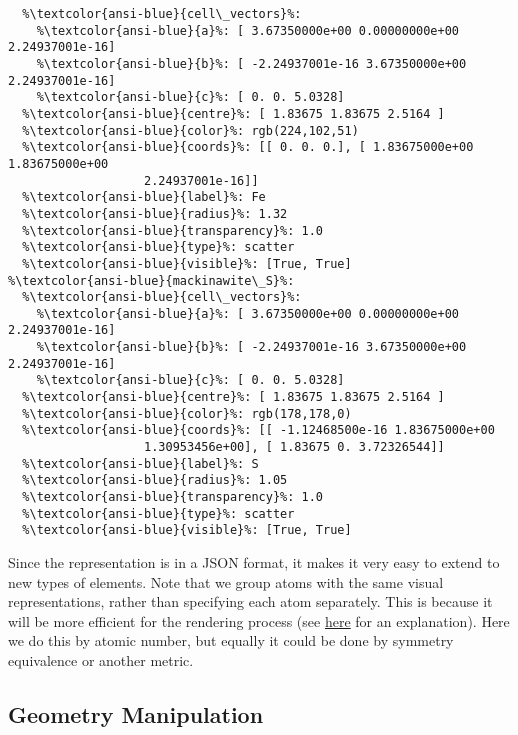\documentclass[10pt,parskip=half,
	toc=sectionentrywithdots,
	bibliography=totocnumbered,
	captions=tableheading,numbers=noendperiod]{scrartcl}
\begin{document}
\begin{lstlisting}[language={},postbreak={},numbers=none,xrightmargin=7pt,belowskip=5pt,aboveskip=5pt,breakindent=0pt,escapechar=\%]
%\textcolor{ansi-blue}{mackinawite\_Fe}%: 
  %\textcolor{ansi-blue}{cell\_vectors}%: 
    %\textcolor{ansi-blue}{a}%: [ 3.67350000e+00 0.00000000e+00 2.24937001e-16]
    %\textcolor{ansi-blue}{b}%: [ -2.24937001e-16 3.67350000e+00 2.24937001e-16]
    %\textcolor{ansi-blue}{c}%: [ 0. 0. 5.0328]
  %\textcolor{ansi-blue}{centre}%: [ 1.83675 1.83675 2.5164 ]
  %\textcolor{ansi-blue}{color}%: rgb(224,102,51)
  %\textcolor{ansi-blue}{coords}%: [[ 0. 0. 0.], [ 1.83675000e+00 1.83675000e+00 
                   2.24937001e-16]]
  %\textcolor{ansi-blue}{label}%: Fe
  %\textcolor{ansi-blue}{radius}%: 1.32
  %\textcolor{ansi-blue}{transparency}%: 1.0
  %\textcolor{ansi-blue}{type}%: scatter
  %\textcolor{ansi-blue}{visible}%: [True, True]
%\textcolor{ansi-blue}{mackinawite\_S}%: 
  %\textcolor{ansi-blue}{cell\_vectors}%: 
    %\textcolor{ansi-blue}{a}%: [ 3.67350000e+00 0.00000000e+00 2.24937001e-16]
    %\textcolor{ansi-blue}{b}%: [ -2.24937001e-16 3.67350000e+00 2.24937001e-16]
    %\textcolor{ansi-blue}{c}%: [ 0. 0. 5.0328]
  %\textcolor{ansi-blue}{centre}%: [ 1.83675 1.83675 2.5164 ]
  %\textcolor{ansi-blue}{color}%: rgb(178,178,0)
  %\textcolor{ansi-blue}{coords}%: [[ -1.12468500e-16 1.83675000e+00 
                   1.30953456e+00], [ 1.83675 0. 3.72326544]]
  %\textcolor{ansi-blue}{label}%: S
  %\textcolor{ansi-blue}{radius}%: 1.05
  %\textcolor{ansi-blue}{transparency}%: 1.0
  %\textcolor{ansi-blue}{type}%: scatter
  %\textcolor{ansi-blue}{visible}%: [True, True]

\end{lstlisting}

Since the representation is in a JSON format, it makes it very easy to
extend to new types of elements. Note that we group atoms with the same
visual representations, rather than specifying each atom separately.
This is because it will be more efficient for the rendering process (see
\href{http://www.ianww.com/blog/2012/11/04/optimizing-three-dot-js-performance-simulating-tens-of-thousands-of-independent-moving-objects/}{here}
for an explanation). Here we do this by atomic number, but equally it
could be done by symmetry equivalence or another metric.

\subsection{Geometry Manipulation}\label{geometry-manipulation}
\end{document}
